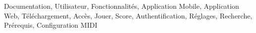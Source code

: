 Documentation, Utilisateur, Fonctionnalités, Application Mobile, Application Web, Téléchargement, Accès, Jouer, Score, Authentification, Réglages, Recherche, Prérequis, Configuration MIDI